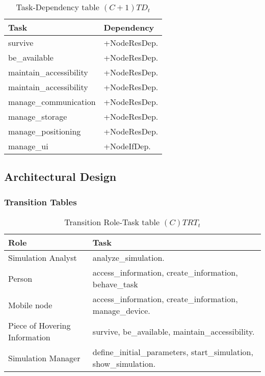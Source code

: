\begin{table}[H]
	\centering
	\begin{tabular}{|p{5cm}|p{7cm}|}
			\hline
			\textbf{Task} & \textbf{Dependency} \\
			\hline
			survive & +NodeResDep. \\
			\hline
			be\_available & +NodeResDep. \\
			\hline
			maintain\_accessibility & +NodeResDep. \\
			\hline
			maintain\_accessibility & +NodeResDep. \\
			\hline
			manage\_communication & +NodeResDep. \\
			\hline
			manage\_storage & +NodeResDep. \\
			\hline
			manage\_positioning & +NodeResDep. \\
			\hline
			manage\_ui & +NodeIfDep. \\
			\hline
		\end{tabular}
	\caption{Task-Dependency table $(C+1)TD_t$}
	\label{tab:cp1tdt}
\end{table}

\subsection{Architectural Design}

\subsubsection{Transition Tables}

\begin{table}[H]
	\centering
	\begin{tabular}{|p{4cm}|p{8cm}|}
			\hline
			\textbf{Role} & \textbf{Task} \\
			\hline
			Simulation Analyst & analyze\_simulation.   \\
			\hline
			Person & access\_information, create\_information, behave\_task \\
			\hline
			Mobile node & access\_information, create\_information, manage\_device.
			\\
			\hline
			Piece of Hovering Information & survive, be\_available,
			maintain\_accessibility. \\
			\hline
			Simulation Manager & define\_initial\_parameters, start\_simulation, show\_simulation. \\
			\hline
		\end{tabular}
	\caption{Transition Role-Task table $(C)TRT_t$}
	\label{tab:ctrtt}
\end{table}

